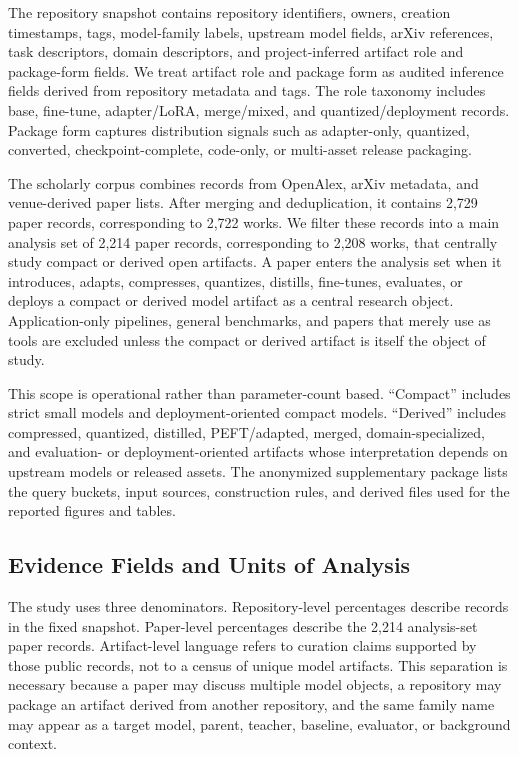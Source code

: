The repository snapshot contains repository identifiers, owners, creation timestamps, tags, model-family labels, upstream model fields, arXiv references, task descriptors, domain descriptors, and project-inferred artifact role and package-form fields. We treat artifact role and package form as audited inference fields derived from repository metadata and tags. The role taxonomy includes base, fine-tune, adapter/LoRA, merge/mixed, and quantized/deployment records. Package form captures distribution signals such as adapter-only, quantized, converted, checkpoint-complete, code-only, or multi-asset release packaging.

The scholarly corpus combines records from OpenAlex, arXiv metadata, and venue-derived paper lists. After merging and deduplication, it contains 2,729 paper records, corresponding to 2,722 works. We filter these records into a main analysis set of 2,214 paper records, corresponding to 2,208 works, that centrally study compact or derived open \llm artifacts. A paper enters the analysis set when it introduces, adapts, compresses, quantizes, distills, fine-tunes, evaluates, or deploys a compact or derived model artifact as a central research object. Application-only pipelines, general benchmarks, and papers that merely use \llms as tools are excluded unless the compact or derived artifact is itself the object of study.

This scope is operational rather than parameter-count based. ``Compact'' includes strict small models and deployment-oriented compact models. ``Derived'' includes compressed, quantized, distilled, PEFT/adapted, merged, domain-specialized, and evaluation- or deployment-oriented artifacts whose interpretation depends on upstream models or released assets. The anonymized supplementary package lists the query buckets, input sources, construction rules, and derived files used for the reported figures and tables.

\subsection{Evidence Fields and Units of Analysis}

The study uses three denominators. Repository-level percentages describe records in the fixed \hf snapshot. Paper-level percentages describe the 2,214 analysis-set paper records. Artifact-level language refers to curation claims supported by those public records, not to a census of unique model artifacts. This separation is necessary because a paper may discuss multiple model objects, a repository may package an artifact derived from another repository, and the same family name may appear as a target model, parent, teacher, baseline, evaluator, or background context.

